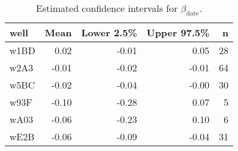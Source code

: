 \begin{table}[ht]
\centering
\begin{tabular}{lrrrr}
  \hline
well & Mean & Lower 2.5\% & Upper 97.5\% & n \\ 
  \hline
w1BD & 0.02 & -0.01 & 0.05 &  28 \\ 
  w2A3 & -0.01 & -0.02 & -0.01 &  64 \\ 
  w5BC & -0.02 & -0.04 & -0.00 &  30 \\ 
  w93F & -0.10 & -0.28 & 0.07 &   5 \\ 
  wA03 & -0.06 & -0.23 & 0.10 &   6 \\ 
  wE2B & -0.06 & -0.09 & -0.04 &  31 \\ 
   \hline
\end{tabular}
\caption{Estimated confidence intervals for $\beta_\text{date}$.} 
\label{tab:beta_date}
\end{table}

